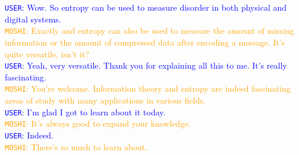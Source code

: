 \begin{tcolorbox}
\textcolor{blue}{\texttt{USER}: Wow. So entropy can be used to measure disorder in both physical and digital systems.} \\
\textcolor{orange}{\texttt{MOSHI}: Exactly and entropy can also be used to measure the amount of missing information or the amount of compressed data after encoding a message. It's quite versatile, isn't it?} \\
\textcolor{blue}{\texttt{USER}: Yeah, very versatile. Thank you for explaining all this to me. It's really fascinating.} \\
\textcolor{orange}{\texttt{MOSHI}: You're welcome. Information theory and entropy are indeed fascinating areas of study with many applications in various fields.} \\
\textcolor{blue}{\texttt{USER}: I'm glad I got to learn about it today.} \\
\textcolor{orange}{\texttt{MOSHI}: It's always good to expand your knowledge.} \\
\textcolor{blue}{\texttt{USER}: Indeed.} \\
\textcolor{orange}{\texttt{MOSHI}: There's so much to learn about.} 
\end{tcolorbox}

